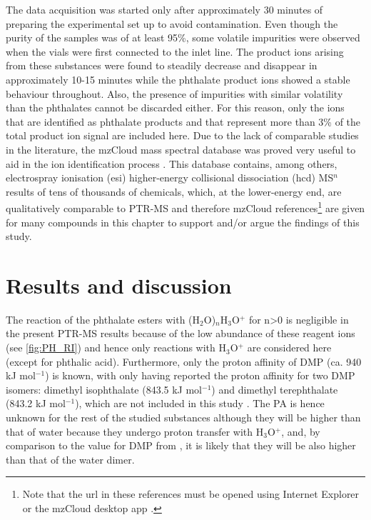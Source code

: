 The data acquisition was started only after approximately 30 minutes of preparing the experimental set up to avoid contamination.
%
Even though the purity of the samples was of at least 95\%, some volatile impurities were observed when the vials were first connected to the inlet line.
%
The product ions arising from these substances were found to steadily decrease and disappear in approximately 10-15 minutes while the phthalate product ions showed a stable behaviour throughout.
%
Also, the presence of impurities with similar volatility than the phthalates cannot be discarded either. 
%
For this reason, only the  ions that are identified as phthalate products and that represent more than 3\% of the total product ion signal are included here.
%
Due to the lack of comparable studies in the literature, the mzCloud mass spectral database was proved very useful to aid in the ion identification process \cite{mzcloudd}.
%
 This database contains, among others, electrospray ionisation (\acrshort{esi}) higher-energy collisional dissociation (\acrshort{hcd}) MS$^n$ results of tens of thousands of chemicals, which, at the lower-energy end,  are qualitatively comparable to PTR-MS and therefore mzCloud references\footnote{Note that the url in these references must be opened using Internet Explorer or the mzCloud desktop app \cite{mzcloudd}.}  are given for many compounds in this chapter to support and/or argue the findings of this study.
 







\section{Results and discussion}

The reaction of the phthalate esters with (H$_2$O)$_n$H$_3$O$^+$ for n>0 is negligible in the present PTR-MS results because of the low abundance of these reagent ions (see \autoref{fig:PH_RI}) and hence only reactions with H$_3$O$^+$ are considered here (except for phthalic acid).
%
Furthermore, only the proton affinity of DMP (ca. 940 kJ mol$^{-1}$) %
is known, with \citeauthor{doi:10.1063/1.556018}  only having reported the proton affinity for two DMP isomers: dimethyl isophthalate (843.5 kJ mol$^{-1}$) and dimethyl terephthalate (843.2 kJ mol$^{-1}$), which are not included in this study \cite{michalczuk2019isomer,doi:10.1063/1.556018}.
%
The PA is hence unknown for the rest of the studied substances although they will  be higher than that of water because they undergo proton transfer with H$_3$O$^+$, and, by comparison  to the value for DMP from \citeauthor{michalczuk2019isomer}, it is likely that they will be also higher than that of the water dimer.
 
